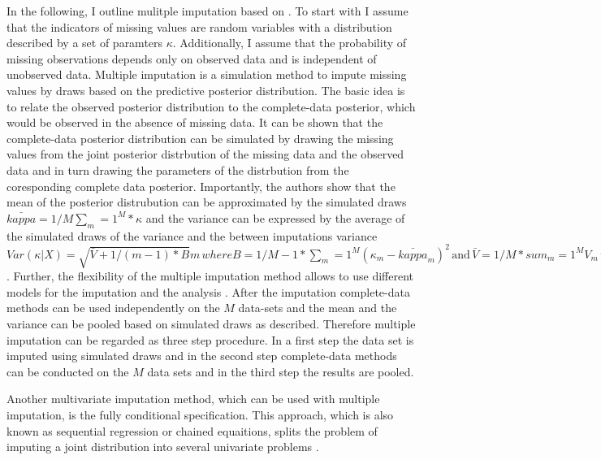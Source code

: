  \par
In the following, I outline mulitple imputation based on \textcite[p.209-211]{Little:2002a}.
To start with I assume that the indicators of missing values are random variables with a distribution described by a set of paramters $\kappa$.
Additionally, I assume that the probability of missing observations depends only on observed data and is independent of unobserved data.
Multiple imputation is a  simulation method to impute missing values by draws based on the predictive posterior distribution.
The basic idea is to relate the observed posterior distribution to the complete-data posterior, which would be observed in the absence of missing data.
It can be shown that the complete-data posterior distribution can be simulated by drawing the missing values from the joint posterior distrbution of the missing data and the observed data
and in turn drawing the parameters of the distrbution from the coresponding complete data posterior.
Importantly, the authors show that the mean of the posterior distrubution can be approximated by the simulated draws $\bar{kappa}=1/M \sum_m=1^M *\kappa$  and the variance can be expressed by the average of the simulated draws of the variance and the between imputations variance $Var(\kappa|X)=\sqrt{\bar{V}+ 1/(m-1)*B}m \, where B=1/{M-1}*\sum_m=1^M(\kappa_m-\bar{kappa}_m)^2 \, \text{and} \,\bar{V}=1/M * sum_m=1^M V_m \, \text{with} V_M=Var{X_obs,X_mis^(d)}$.
Further, the flexibility of the multiple imputation method allows to use different models for the imputation and the analysis \textcite[p.217]{Little:2002a}.
After the imputation complete-data methods can be used independently on the $M$ data-sets and the mean and the variance can be pooled based on simulated draws as described.
Therefore multiple imputation can be regarded as three step procedure.
In a first step the data set is imputed using simulated draws and in the second step complete-data methods can be conducted on the $M$ data sets and in the third step the results are pooled.
\par
Another multivariate imputation method, which can be used with multiple imputation, is the fully conditional specification.
This approach, which is also known as sequential regression or chained equaitions, splits the problem of imputing a joint distribution into several univariate problems \textcite{van2007multiple}.
